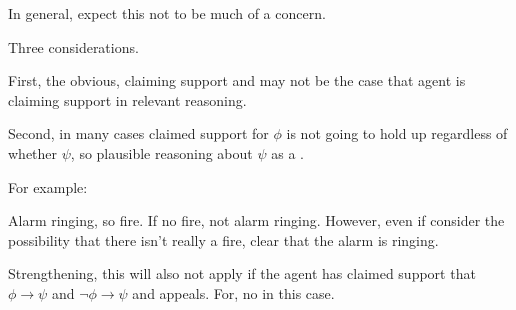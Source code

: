 \begin{note}
  In general, expect this not to be much of a concern.

  Three considerations.
\end{note}

\begin{note}
  First, the obvious, claiming support and may not be the case that agent is claiming support in relevant reasoning.
\end{note}


\begin{note}
  Second, in many cases claimed support for \(\phi\) is not going to hold up regardless of whether \(\psi\), so plausible reasoning about \(\psi\) as a \requ{}.

  For example:

  Alarm ringing, so fire.
  If no fire, not alarm ringing.
  However, even if consider the possibility that there isn't really a fire, clear that the alarm is ringing.
\end{note}

\begin{note}
  Strengthening, this will also not apply if the agent has claimed support that \(\phi \rightarrow \psi\) and \(\lnot \phi \rightarrow \psi\) and appeals.
  For, no \requ{} in this case.
\end{note}

